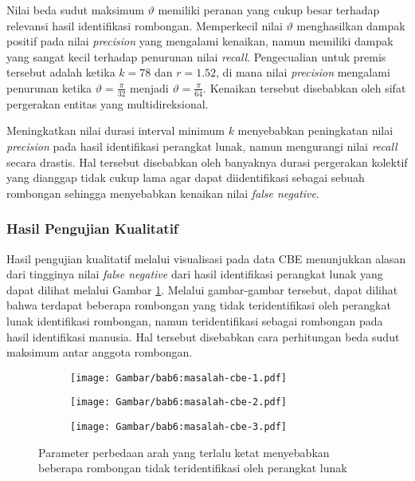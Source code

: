 Nilai beda sudut maksimum $\vartheta$ memiliki peranan yang cukup besar terhadap relevansi hasil identifikasi rombongan. Memperkecil nilai $\vartheta$ menghasilkan dampak positif pada nilai \textit{precision} yang mengalami kenaikan, namun memiliki dampak yang sangat kecil terhadap penurunan nilai \textit{recall}. Pengecualian untuk premis tersebut adalah ketika $k = 78$ dan $r = 1.52$, di mana nilai \textit{precision} mengalami penurunan ketika $\vartheta = \frac{\pi}{32}$ menjadi $\vartheta = \frac{\pi}{64}$. Kenaikan tersebut disebabkan oleh sifat pergerakan entitas yang multidireksional.

Meningkatkan nilai durasi interval minimum $k$ menyebabkan peningkatan nilai \textit{precision} pada hasil identifikasi perangkat lunak, namun mengurangi nilai \textit{recall} secara drastis. Hal tersebut disebabkan oleh banyaknya durasi pergerakan kolektif yang dianggap tidak cukup lama agar dapat diidentifikasi sebagai sebuah rombongan sehingga menyebabkan kenaikan nilai \textit{false negative}. 

\subsubsection{Hasil Pengujian Kualitatif}
\label{subsub:sec:cbe-qualitative}

Hasil pengujian kualitatif melalui visualisasi pada data CBE menunjukkan alasan dari tingginya nilai \textit{false negative} dari hasil identifikasi perangkat lunak yang dapat dilihat melalui Gambar \ref{bab6:masalah-cbe}. Melalui gambar-gambar tersebut, dapat dilihat bahwa terdapat beberapa rombongan yang tidak teridentifikasi oleh perangkat lunak identifikasi rombongan, namun teridentifikasi sebagai rombongan pada hasil identifikasi manusia. Hal tersebut disebabkan cara perhitungan beda sudut maksimum antar anggota rombongan.

\begin{figure}[h]
    \centering
    \captionsetup{width=.75\textwidth}
    \begin{subfigure}[h]{0.25\textwidth}
        \centering
        \texttt{[image: Gambar/bab6:masalah-cbe-1.pdf]}
    \end{subfigure}
    \begin{subfigure}[h]{0.25\textwidth}
        \centering
        \texttt{[image: Gambar/bab6:masalah-cbe-2.pdf]}
    \end{subfigure}
    \begin{subfigure}[h]{0.25\textwidth}
        \centering
        \texttt{[image: Gambar/bab6:masalah-cbe-3.pdf]}
    \end{subfigure}
    \caption[Masalah identifikasi pada data CBE]{Parameter perbedaan arah yang terlalu ketat menyebabkan beberapa rombongan tidak teridentifikasi oleh perangkat lunak}
    \label{bab6:masalah-cbe}
\end{figure}

